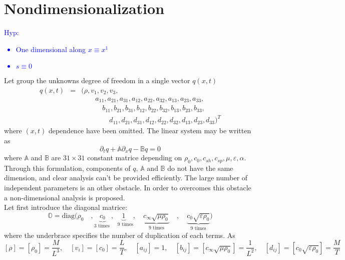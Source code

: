 \documentclass[
10pt, %
a4paper, %
oneside, %
headinclude,footinclude, %
table
]{scrartcl}
\begin{document}
\section{Nondimensionalization}
\textcolor{blue}{Hyp: 
\begin{itemize}
\item One dimensional along $x\equiv x^{1}$ 
\item $s\equiv 0$
\end{itemize}}
Let group the unknowns degree of freedom in a single vector $q(x,t)$
\begin{equation}
\begin{array}{rcl}    
q(x,t)&=&\Big(\rho,v_{1},v_{2},v_{3}, \\
&&	\quad\quad	a_{11}, a_{21}, a_{31},
 	a_{12}, a_{22}, a_{32},
	 a_{13}, a_{23}, a_{33},\\
&& 	\quad\quad\quad 	b_{11}, b_{21}, b_{31},
	b_{12}, b_{22}, b_{32},
 	b_{13}, b_{23}, b_{33},\\
&&  	\quad\quad\quad\quad d_{11}, d_{21}, d_{31},
 		d_{12}, d_{22}, d_{32},
 		d_{13}, d_{23}, d_{33}\Big)^T
\end{array}
\end{equation}
where $(x,t)$ dependence have been omitted. The linear system may be written as 
\begin{equation}\label{LinSyt}
\partial_{t}q+\mathbb{A}\partial_{x}q-\mathbb{B}q=0
\end{equation}
where $\mathbb{A}$ and $\mathbb{B}$ are $31\times 31$ constant matrice depending on $\rho_{0},c_{0},c_{sh},c_{sp},\mu,\varepsilon,\alpha$.\\
Through this formulation, components of $q$, $\mathbb{A}$ and $\mathbb{B}$ do not have the same dimension, and clear analysis can't be provided efficiently. The large number of independent parameters is an other obstacle. In order to overcomes this obstacle a  non-dimensional analysis is proposed.\\
Let first introduce the diagonal matrice:
\begin{equation}
\mathbb{O}=\text{diag}\Big(\rho_{0}\quad,
	\underbrace{c_{0}}_\text{$3$ times },
	\underbrace{1}_\text{ $9$ times}, \quad
	\underbrace{c_{\infty}\sqrt{\mu\rho_{0}}}_{\text{$9$ times}}\quad ,\quad
	\underbrace{c_{0}\sqrt{\varepsilon\rho_{0}}}_{\text{$9$ times}} \Big)
\end{equation}
where the underbrace specifies the number of duplication of each terms. As 
\begin{equation}
\left[\rho\right]=\left[\rho_{0}\right]=\frac{M}{L^3}, \quad
\left[v_{i}\right]=\left[c_{0}\right]=\frac{L}{T}, \quad
\left[a_{ij}\right]=1, \quad
\left[b_{ij}\right]=\left[c_{\infty}\sqrt{\mu\rho_{0}}\right]=\frac{1}{L^2}, \quad
\left[d_{ij}\right]=\left[c_{0}\sqrt{\varepsilon\rho_{0}} \right]=\frac{M}{T}
\end{equation}
\end{document}
